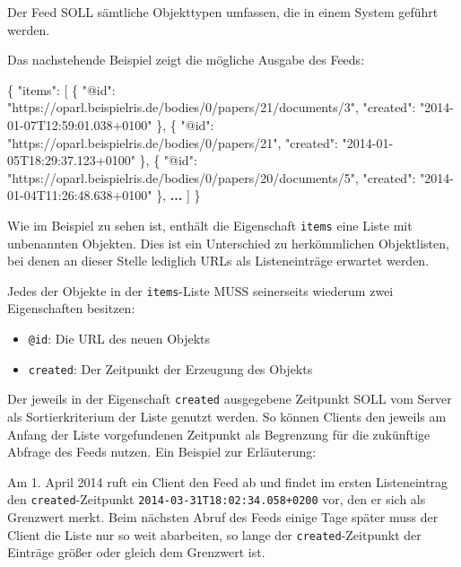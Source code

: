 \documentclass[,a4paper]{article}
\newenvironment{Shaded}{}{}
\newcommand{\DataTypeTok}[1]{\textcolor[rgb]{0.56,0.13,0.00}{{#1}}}
\newcommand{\StringTok}[1]{\textcolor[rgb]{0.25,0.44,0.63}{{#1}}}
\newcommand{\ErrorTok}[1]{\textcolor[rgb]{1.00,0.00,0.00}{\textbf{{#1}}}}
\newcommand{\NormalTok}[1]{{#1}}
\begin{document}
Der Feed SOLL sämtliche Objekttypen umfassen, die in einem System
geführt werden.

Das nachstehende Beispiel zeigt die mögliche Ausgabe des Feeds:

\begin{Shaded}
\begin{Highlighting}[]
\NormalTok{\{}
    \DataTypeTok{"items"}\NormalTok{: [}
        \NormalTok{\{}
            \DataTypeTok{"@id"}\NormalTok{: }\StringTok{"https://oparl.beispielris.de/bodies/0/papers/21/documents/3"}\NormalTok{,}
            \DataTypeTok{"created"}\NormalTok{: }\StringTok{"2014-01-07T12:59:01.038+0100"}
        \NormalTok{\},}
        \NormalTok{\{}
            \DataTypeTok{"@id"}\NormalTok{: }\StringTok{"https://oparl.beispielris.de/bodies/0/papers/21"}\NormalTok{,}
            \DataTypeTok{"created"}\NormalTok{: }\StringTok{"2014-01-05T18:29:37.123+0100"}
        \NormalTok{\},}
        \NormalTok{\{}
            \DataTypeTok{"@id"}\NormalTok{: }\StringTok{"https://oparl.beispielris.de/bodies/0/papers/20/documents/5"}\NormalTok{,}
            \DataTypeTok{"created"}\NormalTok{: }\StringTok{"2014-01-04T11:26:48.638+0100"}
        \NormalTok{\},}
        \ErrorTok{...}
    \NormalTok{]}
\NormalTok{\}}
\end{Highlighting}
\end{Shaded}

Wie im Beispiel zu sehen ist, enthält die Eigenschaft \texttt{items}
eine Liste mit unbenannten Objekten. Dies ist ein Unterschied zu
herkömmlichen Objektlisten, bei denen an dieser Stelle lediglich URLs
als Listeneinträge erwartet werden.

Jedes der Objekte in der \texttt{items}-Liste MUSS seinerseits wiederum
zwei Eigenschaften besitzen:

\begin{itemize}
\itemsep1pt\parskip0pt
\item
  \texttt{@id}: Die URL des neuen Objekts
\item
  \texttt{created}: Der Zeitpunkt der Erzeugung des Objekts
\end{itemize}

Der jeweils in der Eigenschaft \texttt{created} ausgegebene Zeitpunkt
SOLL vom Server als Sortierkriterium der Liste genutzt werden. So können
Clients den jeweils am Anfang der Liste vorgefundenen Zeitpunkt als
Begrenzung für die zukünftige Abfrage des Feeds nutzen. Ein Beispiel zur
Erläuterung:

Am 1. April 2014 ruft ein Client den Feed ab und findet im ersten
Listeneintrag den \texttt{created}-Zeitpunkt
\texttt{2014-03-31T18:02:34.058+0200} vor, den er sich als Grenzwert
merkt. Beim nächsten Abruf des Feeds einige Tage später muss der Client
die Liste nur so weit abarbeiten, so lange der
\texttt{created}-Zeitpunkt der Einträge größer oder gleich dem Grenzwert
ist.
\end{document}
